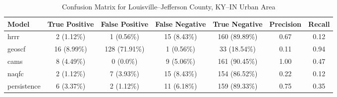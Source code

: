\begin{table}[h!]
\centering
\begin{tabular}{lcccccc}
\hline
Model & True Positive & False Positive & False Negative & True Negative & Precision & Recall\\ \hline
hrrr & 2 (1.12\%) & 1 (0.56\%) & 15 (8.43\%) & 160 (89.89\%) & \cellcolor{red!25}0.67 & \cellcolor{red!25}0.12 \\ 
geoscf & 16 (8.99\%) & 128 (71.91\%) & 1 (0.56\%) & 33 (18.54\%) & \cellcolor{red!25}0.11 & \cellcolor{green!25}0.94 \\ 
cams & 8 (4.49\%) & 0 (0.0\%) & 9 (5.06\%) & 161 (90.45\%) & \cellcolor{green!25}1.00 & \cellcolor{green!25}0.47 \\ 
naqfc & 2 (1.12\%) & 7 (3.93\%) & 15 (8.43\%) & 154 (86.52\%) & \cellcolor{red!25}0.22 & \cellcolor{red!25}0.12 \\ 
persistence & 6 (3.37\%) & 2 (1.12\%) & 11 (6.18\%) & 159 (89.33\%) & 0.75 & 0.35 \\ 
\hline
\end{tabular}
\caption{Confusion Matrix for Louisville--Jefferson County, KY--IN Urban Area}
\end{table}
